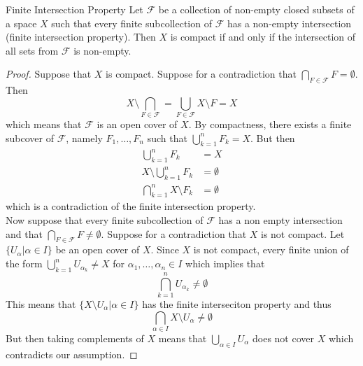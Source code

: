 \documentclass[a4paper]{article}
\begin{document}
\begin{thm}{Finite Intersection Property}{} Let $\mathcal{F}$ be a collection of non-empty closed subsets of a space $X$ such that every finite subcollection of $\mathcal{F}$ has a non-empty intersection (finite intersection property). Then $X$ is compact if and only if the intersection of all sets from $\mathcal{F}$ is non-empty. 
\begin{proof}
Suppose that $X$ is compact. Suppose for a contradiction that $\bigcap_{F\in\mathcal{F}}F=\emptyset$. Then $$X\setminus\bigcap_{F\in\mathcal{F}}=\bigcup_{F\in\mathcal{F}}X\setminus F=X$$ which means that $\mathcal{F}$ is an open cover of $X$. By compactness, there exists a finite subcover of $\mathcal{F}$, namely $F_1,\dots, F_n$ such that $\bigcup_{k=1}^nF_k=X$. But then 
\begin{align*}
\bigcup_{k=1}^nF_k&=X\\
X\setminus\bigcup_{k=1}^nF_k&=\emptyset\\
\bigcap_{k=1}^nX\setminus F_k&=\emptyset
\end{align*}
which is a contradiction of the finite intersection property. \\
Now suppose that every finite subcollection of $\mathcal{F}$ has a non empty intersection and that $\bigcap_{F\in\mathcal{F}}F\neq\emptyset$. Suppose for a contradiction that $X$ is not compact. Let $\{U_\alpha|\alpha\in I\}$ be an open cover of $X$. Since $X$ is not compact, every finite union of the form $\bigcup_{k=1}^nU_{\alpha_k}\neq X$ for $\alpha_1,\dots,\alpha_n\in I$ which implies that $$\bigcap_{k=1}^nU_{\alpha_k}\neq\emptyset$$ This means that $\{X\setminus U_\alpha|\alpha\in I\}$ has the finite interseciton property and thus $$\bigcap_{\alpha\in I}X\setminus U_\alpha\neq\emptyset$$ But then taking complements of $X$ means that $\bigcup_{\alpha\in I}U_\alpha$ does not cover $X$ which contradicts our assumption. 
\end{proof}
\end{thm}
\end{document}
